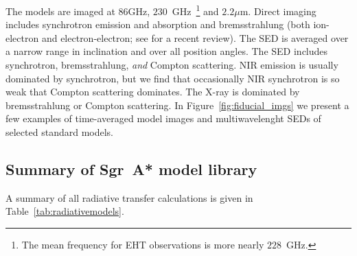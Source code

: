 The models are imaged at $86$GHz, $230$~GHz~\footnote{The mean frequency for  EHT observations is more nearly $228$~GHz.} and $2.2\mu$m.  Direct imaging includes synchrotron emission and absorption and bremsstrahlung (both ion-electron and electron-electron; see \citet{2020ApJ...898...50Y} for a recent review).  The SED is averaged over a narrow range in inclination and over all position angles. The SED includes synchrotron, bremsstrahlung, {\em and} Compton scattering.  NIR emission is usually dominated by synchrotron, but we find that occasionally NIR synchrotron is so weak that Compton scattering dominates.  The X-ray is dominated by bremsstrahlung or Compton scattering. 
In Figure~\ref{fig:fiducial_imgs} we present a few examples of time-averaged model images and multiwavelenght SEDs of selected standard \sgra models.

\subsection{Summary of Sgr~A* model library}

A summary of all radiative transfer calculations is given in Table~\ref{tab:radiativemodels}.

